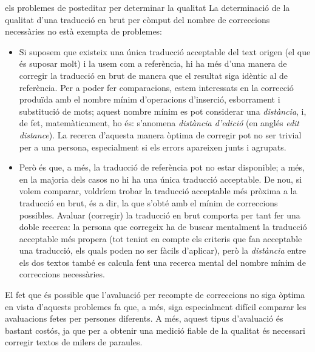 \begin{persabermes}{els problemes de posteditar per determinar la qualitat}
  La determinació de la qualitat d'una traducció en brut per còmput
  del nombre de correccions necessàries no està exempta de problemes:
\begin{itemize}
\item Si suposem que existeix una única traducció acceptable del text
  origen (el que és suposar molt) i la usem com a referència, hi ha més
  d'una manera de corregir la traducció en brut de manera que el
  resultat siga idèntic al de referència. Per a poder fer
  comparacions, estem interessats en la correcció produïda amb el
  nombre mínim d'operacions d'inserció, esborrament i substitució de
  mots; aquest nombre mínim es pot considerar una \emph{distància}, i,
  de fet, matemàticament, ho és: s'anomena \emph{distància d'edició}
  (en anglés \emph{edit distance}). La recerca d'aquesta manera òptima
  de corregir pot no ser trivial per a una persona, especialment si
  els errors apareixen junts i agrupats.
\item Però és que, a més, la traducció de referència pot no estar
  disponible; a més, en la majoria dels casos no hi ha una única
  traducció acceptable. De nou, si volem comparar, voldríem trobar la
  traducció acceptable més pròxima a la traducció en brut, és a dir,
  la que s'obté amb el mínim de correccions possibles. Avaluar
  (corregir) la traducció en brut comporta per tant fer una doble
  recerca: la persona que corregeix ha de buscar mentalment la
  traducció acceptable més propera (tot tenint en compte els criteris
  que fan acceptable una traducció, els quals poden no ser fàcils
  d'aplicar), però la \emph{distància} entre els dos textos també es
  calcula fent una recerca mental del nombre mínim de correccions
  necessàries.
\end{itemize}
El fet que és possible que l'avaluació per recompte de correccions no
siga òptima en vista d'aquests problemes fa que, a més, siga
especialment difícil comparar les avaluacions fetes per persones
diferents. A més, aquest tipus d'avaluació és bastant costós, ja que
per a obtenir una medició fiable de la qualitat és necessari corregir
textos de milers de paraules.  
\end{persabermes}

